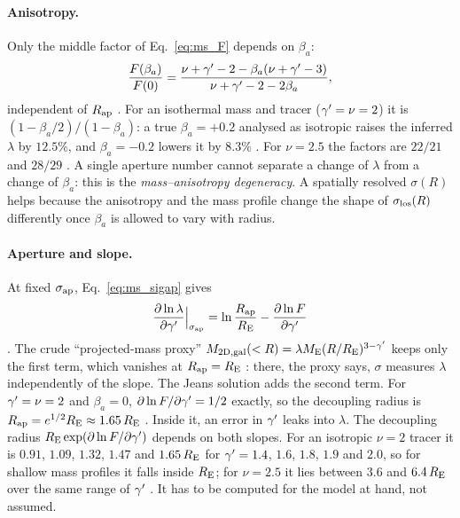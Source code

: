 \paragraph{Anisotropy.}  Only the middle factor of Eq.~\eqref{eq:ms_F}
depends on $\beta_a$:
\begin{equation}
    \frac{F(\beta_a)}{F(0)}=\frac{\nu+\gamma'-2-\beta_a(\nu+\gamma'-3)}{\nu+\gamma'-2-2\beta_a},
    \label{eq:ms_aniso}
\end{equation}
independent of $R_{\rm ap}$ .  For an isothermal mass and tracer
($\gamma'=\nu=2$) it is $(1-\beta_a/2)/(1-\beta_a)$: a true $\beta_a=+0.2$
analysed as isotropic raises the inferred $\lambda$ by $12.5\%$, and
$\beta_a=-0.2$ lowers it by $8.3\%$ .  For $\nu=2.5$ the
factors are $22/21$ and $28/29$ .  A single aperture number cannot
separate a change of $\lambda$ from a change of $\beta_a$: this is the
\emph{mass--anisotropy degeneracy}.  A spatially resolved $\sigma(R)$ helps
because the anisotropy and the mass profile change the shape of
$\sigma_{\rm los}(R)$ differently once $\beta_a$ is allowed to vary with radius.

\paragraph{Aperture and slope.}  At fixed $\sigma_{\rm ap}$,
Eq.~\eqref{eq:ms_sigap} gives
\begin{equation}
    \frac{\partial\ln\lambda}{\partial\gamma'}\Big|_{\sigma_{\rm ap}}
    =\ln\frac{R_{\rm ap}}{R_{\rm E}}-\frac{\partial\ln F}{\partial\gamma'}
    \label{eq:ms_aperture}
\end{equation}
.  The crude ``projected-mass proxy''
$M_{\rm 2D,gal}(<R)=\lambda M_{\rm E}(R/R_{\rm E})^{3-\gamma'}$ keeps only the
first term, which vanishes at $R_{\rm ap}=R_{\rm E}$ : there, the
proxy says, $\sigma$ measures $\lambda$ independently of the slope.  The Jeans
solution adds the second term.  For $\gamma'=\nu=2$ and $\beta_a=0$,
$\partial\ln F/\partial\gamma'=1/2$ exactly, so the decoupling radius is
$R_{\rm ap}=e^{1/2}R_{\rm E}\approx1.65\,R_{\rm E}$ .  Inside it, an
error in $\gamma'$ leaks into $\lambda$.  The decoupling radius
$R_{\rm E}\exp(\partial\ln F/\partial\gamma')$ depends on both slopes.  For an
isotropic $\nu=2$ tracer it is $0.91$, $1.09$, $1.32$, $1.47$ and
$1.65\,R_{\rm E}$ for $\gamma'=1.4$, $1.6$, $1.8$, $1.9$ and $2.0$, so for shallow
mass profiles it falls inside $R_{\rm E}$; for $\nu=2.5$ it lies
between $3.6$ and $6.4\,R_{\rm E}$ over the same range of $\gamma'$
.  It has to be computed for the model at hand, not
assumed.

